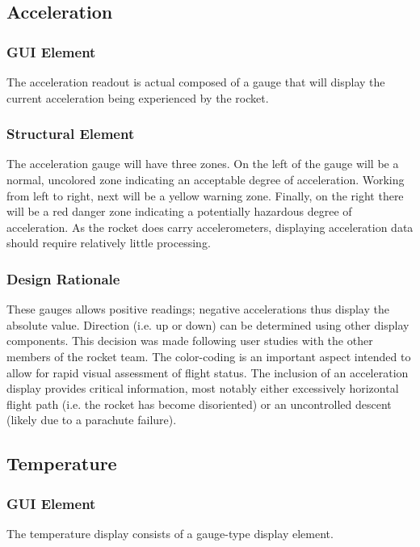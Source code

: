 \documentclass[journal,10pt,onecolumn,compsoc]{IEEEtran}
\begin{document}
	\subsection{Acceleration}

		\subsubsection{GUI Element}
			The acceleration readout is actual composed of a gauge that will display the current acceleration being experienced by the rocket.
			
		\subsubsection{Structural Element}
			The acceleration gauge will have three zones.
			On the left of the gauge will be a normal, uncolored zone indicating an acceptable degree of acceleration.
			Working from left to right, next will be a yellow warning zone.
			Finally, on the right there will be a red danger zone indicating a potentially hazardous degree of acceleration.
			As the rocket does carry accelerometers, displaying acceleration data should require relatively little processing.

		\subsubsection{Design Rationale}
			These gauges allows positive readings; negative accelerations thus display the absolute value. 
      Direction (i.e. up or down) can be determined using other display components.
      This decision was made following user studies with the other members of the rocket team.
      The color-coding is an important aspect intended to allow for rapid visual assessment of flight status.
			The inclusion of an acceleration display provides critical information, most notably either excessively horizontal flight path (i.e. the rocket has become disoriented) or an uncontrolled descent (likely due to a parachute failure).

  \subsection{Temperature}

		\subsubsection{GUI Element}
			The temperature display consists of a gauge-type display element.
					
\end{document}

